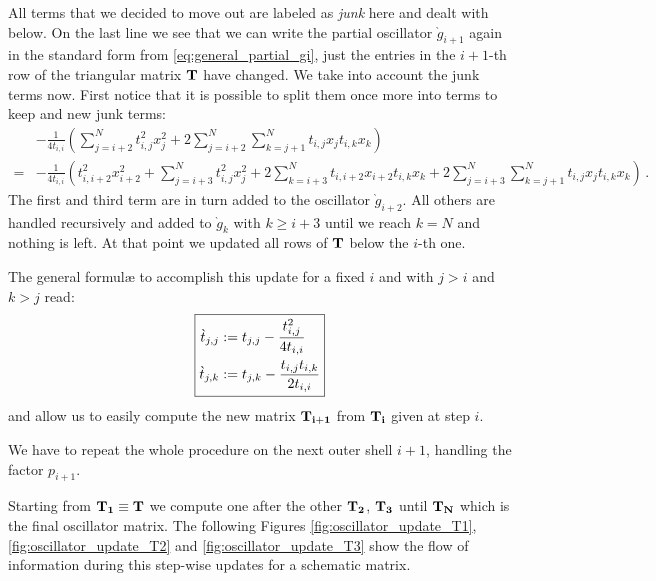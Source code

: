 \documentclass[a4paper,10pt]{article}
\begin{document}
All terms that we decided to move out are labeled as \emph{junk} here and dealt
with below.
On the last line we see that we can write the partial oscillator $\grave{g}_{i+1}$
again in the standard form from \eqref{eq:general_partial_gi}, just the
entries in the $i+1$-th row of the triangular matrix $\mathbf{T}$ have changed.
We take into account the junk terms now. First notice that it is possible
to split them once more into terms to keep and new junk terms:
\begin{equation*}
\begin{split}
  & - \frac{1}{4 t_{i,i}}
      \left(
        \sum_{j=i+2}^{N} t_{i,j}^2 x_j^2
        +
        2 \sum_{j=i+2}^{N} \sum_{k=j+1}^{N} t_{i,j} x_j t_{i,k} x_k
      \right) \\
  = & - \frac{1}{4 t_{i,i}}
      \left(
        t_{i,i+2}^2 x_{i+2}^2
        +
        \sum_{j=i+3}^{N} t_{i,j}^2 x_j^2
        +
        2 \sum_{k=i+3}^{N} t_{i,i+2} x_{i+2} t_{i,k} x_k
        +
        2 \sum_{j=i+3}^{N} \sum_{k=j+1}^{N} t_{i,j} x_j t_{i,k} x_k
      \right) \,.
\end{split}
\end{equation*}
The first and third term are in turn added to the oscillator $\grave{g}_{i+2}$.
All others are handled recursively and added to $\grave{g}_{k}$ with $k \geq i+3$
until we reach $k=N$ and nothing is left. At that point we updated all
rows of $\mathbf{T}$ below the $i$-th one.

The general formul\ae{} to accomplish this update for a fixed $i$ and
with $j > i$ and $k > j$ read:
\begin{equation} \label{eq:matrix_update_formulae}
\boxed{
\begin{split}
  \grave{t}_{j,j} & := t_{j,j} - \frac{t_{i,j}^2}{4 t_{i,i}} \\
  \grave{t}_{j,k} & := t_{j,k} - \frac{t_{i,j} t_{i,k}}{2 t_{i,i}}
\end{split}
}
\end{equation}
and allow us to easily compute the new matrix $\mathbf{T_{i+1}}$ from
$\mathbf{T_i}$ given at step $i$.

We have to repeat the whole procedure on the next outer shell $i+1$,
handling the factor $p_{i+1}$.

Starting from $\mathbf{T_1} \equiv \mathbf{T}$ we compute one after the other
$\mathbf{T_2}$, $\mathbf{T_3}$ until $\mathbf{T_N}$ which is the final oscillator
matrix. The following Figures \ref{fig:oscillator_update_T1}, \ref{fig:oscillator_update_T2}
and  \ref{fig:oscillator_update_T3} show the flow of information during this
step-wise updates for a schematic matrix.
\end{document}
